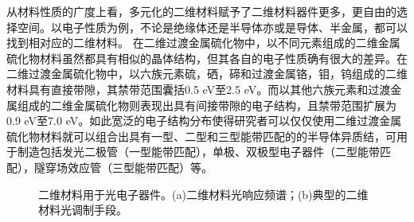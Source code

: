     从材料性质的广度上看，多元化的二维材料赋予了二维材料器件更多，更自由的选择空间。以电子性质为例，不论是绝缘体还是半导体亦或是导体、半金属，都可以找到相对应的二维材料。
    在二维过渡金属硫化物中，以不同元素组成的二维金属硫化物材料虽然都具有相似的晶体结构，但其各自的电子性质确有很大的差异。在二维过渡金属硫化物中，以六族元素硫，硒，碲和过渡金属铬，钼，钨组成的二维材料具有直接带隙，其禁带范围囊括0.5 eV至2.5 eV。而以其他六族元素和过渡金属组成的二维金属硫化物则表现出具有间接带隙的电子结构，且禁带范围扩展为0.9 eV至7.0 eV。如此宽泛的电子结构分布使得研究者可以仅仅使用二维过渡金属硫化物材料就可以组合出具有一型、二型和三型能带匹配的的半导体异质结，可用于制造包括发光二极管（一型能带匹配），单极、双极型电子器件（二型能带匹配），隧穿场效应管（三型能带匹配）等。

    \begin{figure}[htb]
        \caption{二维材料用于光电子器件。(a)二维材料光响应频谱；(b)典型的二维材料光调制手段。}
        \label{}
    \end{figure}

